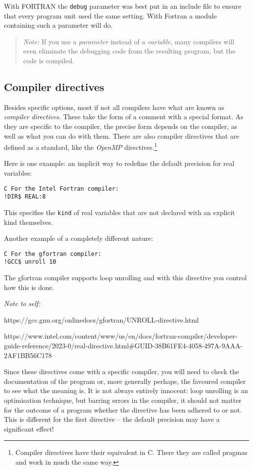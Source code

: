 With FORTRAN the \verb+debug+ parameter was best put in an include file to ensure that every program unit
used the same setting. With Fortran a module containing such a parameter will do.

\begin{quote}
\emph{Note:} If you use a \emph{parameter} instead of a \emph{variable}, many compilers will even eliminate
the debugging code from the resulting program, but the code is compiled.
\end{quote}


\subsection{Compiler directives}
Besides specific options, most if not all compilers have what are known as \emph{compiler directives}. These
take the form of a comment with a special format. As they are specific to the compiler, the precise form
depends on the compiler, as well as what you can do with them. There are also compiler directives that
are defined as a standard, like the \emph{OpenMP} directives.\footnote{Compiler directives have their
equivalent in C. There they are called pragmas and work in much the same way.}

Here is one example: an implicit way to redefine the default precision for real variables:

\begin{verbatim}
C For the Intel Fortran compiler:
!DIR$ REAL:8
\end{verbatim}

This specifies the \verb+kind+ of real variables that are not declared with an explicit kind themselves.

Another example of a completely different nature:

\begin{verbatim}
C For the gfortran compiler:
!GCC$ unroll 10
\end{verbatim}

The gfortran compiler supports loop unrolling and with this directive you control how this is done.

\emph{Note to self:}

https://gcc.gnu.org/onlinedocs/gfortran/UNROLL-directive.html

https://www.intel.com/content/www/us/en/docs/fortran-compiler/developer-guide-reference/2023-0/real-directive.html\#GUID-38B61FE4-4058-497A-9AAA-2AF1BB56C178


Since these directives come with a specific compiler, you will need to check the documentation of
the program or, more generally perhaps, the favoured compiler to see what the meaning is. It is not
always entirely innocent: loop unrolling is an optimisation technique, but barring errors in the
compiler, it should not matter for the outcome of a program whether the directive has been adhered
to or not. This is different for the first directive -- the default precision may have a significant
effect!


